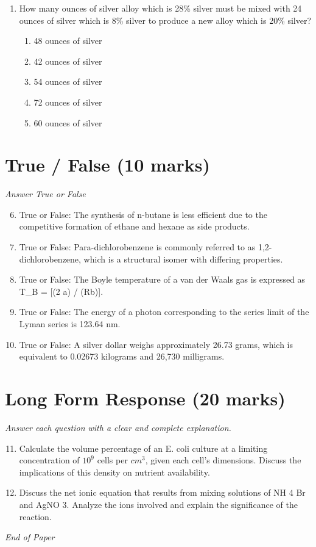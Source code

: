 \documentclass[12pt]{article}
\begin{document}
\begin{enumerate}[label=\arabic*.]
\begin{enumerate}[label=(\alph*)]
    \item H$_{3}$O+ / H$_{2}$O
    \item O$_{2}$ / H$_{2}$O
\end{enumerate}
\item How many ounces of silver alloy which is 28\% silver must be mixed with 24 ounces of silver which is 8\% silver to produce a new alloy which is 20\% silver?
\begin{enumerate}[label=(\alph*)]
    \item 48 ounces of silver
    \item 42 ounces of silver
    \item 54 ounces of silver
    \item 72 ounces of silver
    \item 60 ounces of silver
\end{enumerate}
\end{enumerate}

\section*{True / False (10 marks)}
\textit{Answer True or False}
\begin{enumerate}[label=\arabic*.]
\setcounter{enumi}{5}
\item True or False: The synthesis of n-butane is less efficient due to the competitive formation of ethane and hexane as side products.
\item True or False: Para-dichlorobenzene is commonly referred to as 1,2-dichlorobenzene, which is a structural isomer with differing properties.
\item True or False: The Boyle temperature of a van der Waals gas is expressed as T\_B = [(2 a) / (Rb)].
\item True or False: The energy of a photon corresponding to the series limit of the Lyman series is 123.64 nm.
\item True or False: A silver dollar weighs approximately 26.73 grams, which is equivalent to 0.02673 kilograms and 26,730 milligrams.
\end{enumerate}

\section*{Long Form Response (20 marks)}
\textit{Answer each question with a clear and complete explanation.}
\begin{enumerate}[label=\arabic*.]
\setcounter{enumi}{10}
\item Calculate the volume percentage of an E. coli culture at a limiting concentration of $10^9$ cells per $cm^3$, given each cell's dimensions. Discuss the implications of this density on nutrient availability.
\item Discuss the net ionic equation that results from mixing solutions of NH 4 Br and AgNO 3. Analyze the ions involved and explain the significance of the reaction.
\end{enumerate}

\vfill
\noindent\textit{End of Paper}
\end{document}
